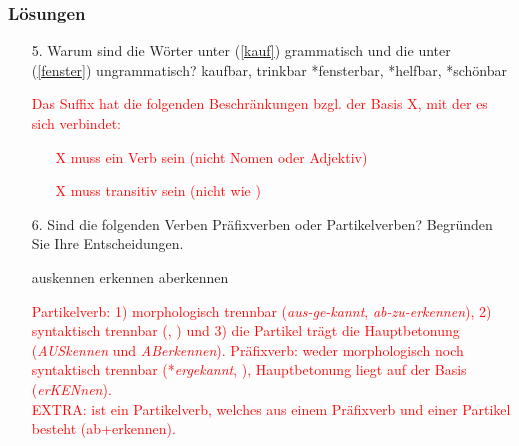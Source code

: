 \begin{frame}
\frametitle{Lösungen}
\begin{itemize}
	\item[5.] Warum sind die Wörter unter (\ref{kauf}) grammatisch und die unter (\ref{fenster}) ungrammatisch? %
	\eal
	\ex\label{kauf} kaufbar, trinkbar
	\ex\label{fenster} *fensterbar, *helfbar, *schönbar
	\zl
	
	\textcolor{red}{
		Das Suffix  hat die folgenden Beschränkungen bzgl. der Basis X, mit der es sich verbindet:
		\begin{itemize}
			\item[] X muss ein Verb sein (nicht Nomen oder Adjektiv)
			\item[] X muss transitiv sein (nicht wie )
		\end{itemize}
	}

	\item [6.] Sind die folgenden Verben Präfixverben oder Partikelverben? Begründen Sie Ihre Entscheidungen. %
	
	\eal
	\ex auskennen
	\ex erkennen
	\ex aberkennen
	\zl
	
	\textcolor{red}{
		Partikelverb: 1) morphologisch trennbar (\emph{aus-ge-kannt}, \emph{ab-zu-erkennen}), 2) syntaktisch trennbar (, ) und 3) die Partikel trägt die Hauptbetonung (\emph{AUSkennen} und \emph{ABerkennen}).
		Präfixverb: weder morphologisch noch syntaktisch trennbar (*\emph{ergekannt}, ), Hauptbetonung liegt auf der Basis (\emph{erKENnen}).\\
		\bigskip
		EXTRA:  ist ein Partikelverb, welches aus einem Präfixverb und einer Partikel besteht (ab+erkennen).\\
	}
\end{itemize}

\end{frame}


